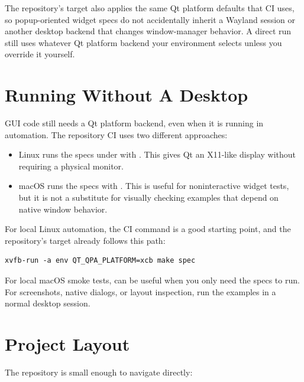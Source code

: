 The repository's  target also applies the same Qt platform defaults that CI uses, so popup-oriented widget specs do not accidentally inherit a Wayland session or another desktop backend that changes window-manager behavior. A direct  run still uses whatever Qt platform backend your environment selects unless you override it yourself.

\section{Running Without A Desktop}

GUI code still needs a Qt platform backend, even when it is running in automation. The repository CI uses two different approaches:

\begin{itemize}
\item Linux runs the specs under  with . This gives Qt an X11-like display without requiring a physical monitor.
\item macOS runs the specs with . This is useful for noninteractive widget tests, but it is not a substitute for visually checking examples that depend on native window behavior.
\end{itemize}

For local Linux automation, the CI command is a good starting point, and the repository's  target already follows this path:

\begin{lstlisting}[style=crystal]
xvfb-run -a env QT_QPA_PLATFORM=xcb make spec
\end{lstlisting}

For local macOS smoke tests,  can be useful when you only need the specs to run. For screenshots, native dialogs, or layout inspection, run the examples in a normal desktop session.

\section{Project Layout}

The repository is small enough to navigate directly:

